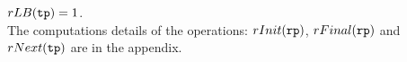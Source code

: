 $rLB(\mathtt{tp}) =  1$.
\\
The computations details of the operations: $rInit(\mathtt{rp})$,
$rFinal(\mathtt{rp})$ and $rNext(\mathtt{tp})$
are in the appendix.
%
